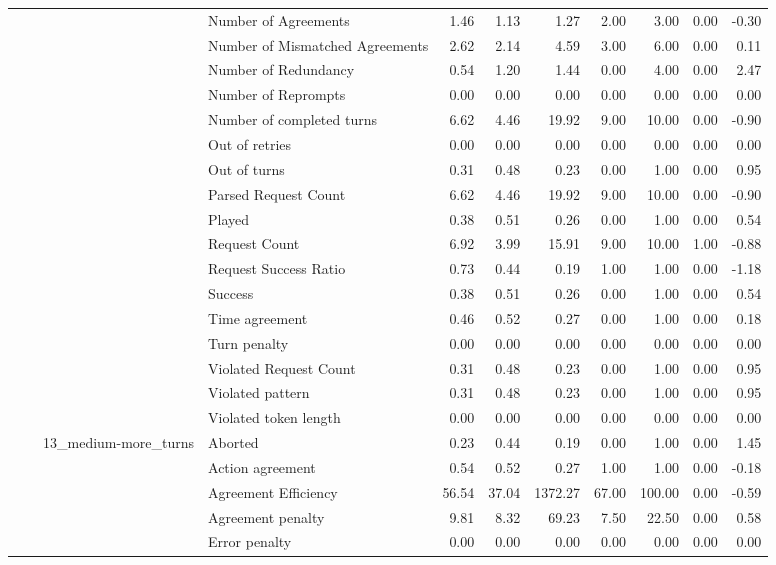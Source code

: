 \begin{tabular}{llllrrrrrrr}
 &  &  & Number of Agreements & 1.46 & 1.13 & 1.27 & 2.00 & 3.00 & 0.00 & -0.30 \\
 &  &  & Number of Mismatched Agreements & 2.62 & 2.14 & 4.59 & 3.00 & 6.00 & 0.00 & 0.11 \\
 &  &  & Number of Redundancy & 0.54 & 1.20 & 1.44 & 0.00 & 4.00 & 0.00 & 2.47 \\
 &  &  & Number of Reprompts & 0.00 & 0.00 & 0.00 & 0.00 & 0.00 & 0.00 & 0.00 \\
 &  &  & Number of completed turns & 6.62 & 4.46 & 19.92 & 9.00 & 10.00 & 0.00 & -0.90 \\
 &  &  & Out of retries & 0.00 & 0.00 & 0.00 & 0.00 & 0.00 & 0.00 & 0.00 \\
 &  &  & Out of turns & 0.31 & 0.48 & 0.23 & 0.00 & 1.00 & 0.00 & 0.95 \\
 &  &  & Parsed Request Count & 6.62 & 4.46 & 19.92 & 9.00 & 10.00 & 0.00 & -0.90 \\
 &  &  & Played & 0.38 & 0.51 & 0.26 & 0.00 & 1.00 & 0.00 & 0.54 \\
 &  &  & Request Count & 6.92 & 3.99 & 15.91 & 9.00 & 10.00 & 1.00 & -0.88 \\
 &  &  & Request Success Ratio & 0.73 & 0.44 & 0.19 & 1.00 & 1.00 & 0.00 & -1.18 \\
 &  &  & Success & 0.38 & 0.51 & 0.26 & 0.00 & 1.00 & 0.00 & 0.54 \\
 &  &  & Time agreement & 0.46 & 0.52 & 0.27 & 0.00 & 1.00 & 0.00 & 0.18 \\
 &  &  & Turn penalty & 0.00 & 0.00 & 0.00 & 0.00 & 0.00 & 0.00 & 0.00 \\
 &  &  & Violated Request Count & 0.31 & 0.48 & 0.23 & 0.00 & 1.00 & 0.00 & 0.95 \\
 &  &  & Violated pattern & 0.31 & 0.48 & 0.23 & 0.00 & 1.00 & 0.00 & 0.95 \\
 &  &  & Violated token length & 0.00 & 0.00 & 0.00 & 0.00 & 0.00 & 0.00 & 0.00 \\
\cline{3-11}
 &  & \multirow[t]{27}{*}{13_medium-more_turns} & Aborted & 0.23 & 0.44 & 0.19 & 0.00 & 1.00 & 0.00 & 1.45 \\
 &  &  & Action agreement & 0.54 & 0.52 & 0.27 & 1.00 & 1.00 & 0.00 & -0.18 \\
 &  &  & Agreement Efficiency & 56.54 & 37.04 & 1372.27 & 67.00 & 100.00 & 0.00 & -0.59 \\
 &  &  & Agreement penalty & 9.81 & 8.32 & 69.23 & 7.50 & 22.50 & 0.00 & 0.58 \\
 &  &  & Error penalty & 0.00 & 0.00 & 0.00 & 0.00 & 0.00 & 0.00 & 0.00 \\

\end{tabular}

